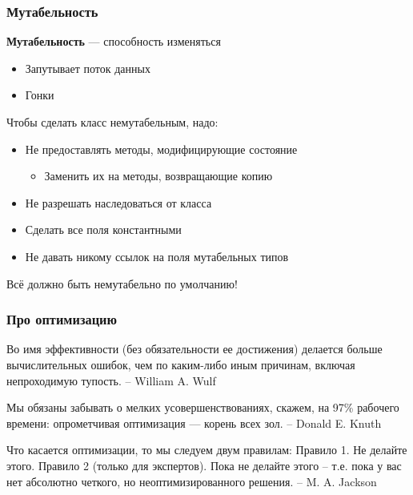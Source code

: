 \documentclass{../../slides-style}
\begin{document}
    \begin{frame}
        \frametitle{Мутабельность}
        \textbf{Мутабельность} --- способность изменяться
        \begin{itemize}
            \item Запутывает поток данных
            \item Гонки
        \end{itemize}
        \vspace{3mm}
        Чтобы сделать класс немутабельным, надо:
        \begin{itemize}
            \item Не предоставлять методы, модифицирующие состояние
            \begin{itemize}
                \item Заменить их на методы, возвращающие копию
            \end{itemize}
            \item Не разрешать наследоваться от класса
            \item Сделать все поля константными
            \item Не давать никому ссылок на поля мутабельных типов
        \end{itemize}
        Всё должно быть немутабельно по умолчанию!
    \end{frame}

    \begin{frame}
        \frametitle{Про оптимизацию}
        Во имя эффективности (без обязательности ее достижения) делается больше вычислительных ошибок, чем по каким-либо иным причинам, включая непроходимую тупость. \newline
        -- William A. Wulf 
    
        \vspace{3mm}
        Мы обязаны забывать о мелких усовершенствованиях, ска­жем, на 97\% рабочего времени: опрометчивая оптимизация --- корень всех зол. \newline
        -- Donald E. Knuth
    
        \vspace{3mm}
        Что касается оптимизации, то мы следуем двум правилам: \newline
        Правило 1. Не делайте этого.  \newline
        Правило 2 (только для экспертов). Пока не делайте этого -- т.е. пока у вас нет абсолютно четкого, но неоптимизированного решения. \newline
        -- M. A. Jackson
    \end{frame}
\end{document}
